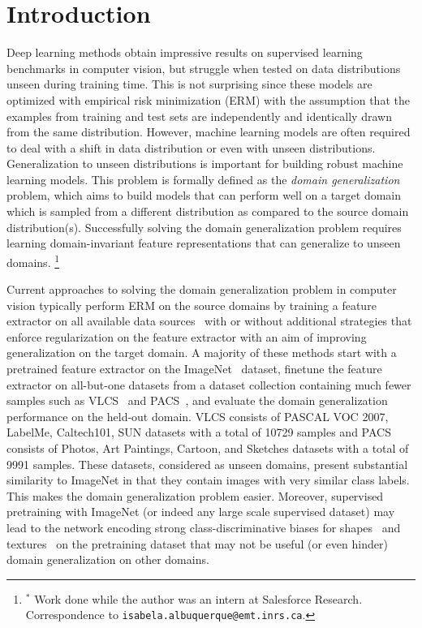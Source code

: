 \documentclass[runningheads]{llncs}
\newcommand\blfootnote[1]{\begingroup
  \renewcommand\thefootnote{}\footnote{#1}\addtocounter{footnote}{-1}\endgroup
}
\begin{document}
\section{Introduction}
Deep learning methods obtain impressive results on supervised learning benchmarks in computer vision, but struggle when tested on data distributions unseen during training time. This is not surprising since these models are optimized with empirical risk minimization (ERM) with the assumption that the examples from training and test sets are independently and identically drawn from the same distribution. However, machine learning models are often required to deal with a shift in data distribution or even with unseen distributions. Generalization to unseen distributions is important for building robust machine learning models. This problem is formally defined as the \textit{domain generalization} problem, which aims to build models that can perform well on a target domain which is sampled from a different distribution as compared to the source domain distribution(s). Successfully solving the domain generalization problem requires learning domain-invariant feature representations that can generalize to unseen domains. \blfootnote{$^*$ Work done while the author was an intern at Salesforce Research. Correspondence to \texttt{isabela.albuquerque@emt.inrs.ca}.} 

Current approaches to solving the domain generalization problem in computer vision typically perform ERM on the source domains by training a feature extractor on all available data sources~\cite{li2017deeper,li2018learning,carlucci2019domain} with or without additional strategies that enforce regularization on the feature extractor with an aim of improving generalization on the target domain. A  majority of these methods start with a pretrained feature extractor on the ImageNet~\cite{deng2009imagenet} dataset, finetune the feature extractor on all-but-one datasets from a dataset collection containing much fewer samples such as VLCS~\cite{torralba2011unbiased} and PACS~\cite{li2017deeper}, and evaluate the domain generalization performance on the held-out domain.  VLCS consists of PASCAL VOC 2007, LabelMe, Caltech101, SUN datasets with a total of 10729 samples and  PACS consists of Photos, Art Paintings, Cartoon, and Sketches datasets with a total of 9991 samples. These datasets, considered as unseen domains, present substantial similarity to ImageNet in that they contain images with very similar class labels. This makes the domain generalization problem easier. Moreover, supervised pretraining with ImageNet (or indeed any large scale supervised dataset) may lead to the network encoding strong class-discriminative biases for shapes~\cite{kriegeskorte2015deep} and textures~\cite{geirhos2018imagenet} on the pretraining dataset that may not be useful (or even hinder) domain generalization on other domains. 
\end{document}
